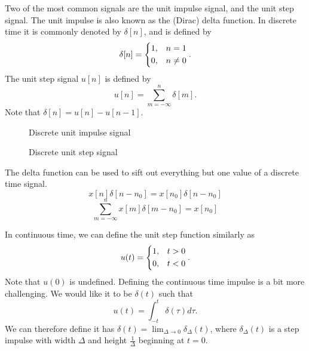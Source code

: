 \documentclass[12pt]{article}
\begin{document}
Two of the most common signals are the unit impulse signal, and the unit step signal. The unit impulse is also known as the (Dirac) delta function. In discrete time it is commonly denoted by $\delta[n]$, and is defined by
\[\delta[n] =
\begin{dcases}
    1, & n = 1 \\
    0, & n \neq 0
\end{dcases}.\] The unit step signal $u[n]$ is defined by
\[u[n] = \sum_{m=-\infty}^{n}\delta[m].\] Note that $\delta[n] = u[n] - u[n-1]$.

\begin{figure}[ht!]
    \centering
\caption{Discrete unit impulse signal}
\label{fig:discrete-unit-impulse}
\end{figure}

\begin{figure}[ht!]
    \centering
\caption{Discrete unit step signal}
\label{fig:discrete-unit-step}
\end{figure}

The delta function can be used to sift out everything but one value of a discrete time signal.
\[x[n]\delta[n-n_0] = x[n_0]\delta[n-n_0]\]
\[\sum_{m=-\infty}^n x[m]\delta[m-n_0] = x[n_0]\]

In continuous time, we can define the unit step function similarly as \[u(t) =
\begin{dcases}
    1, & t > 0 \\
    0, & t < 0
\end{dcases}.\]
Note that $u(0)$ is undefined. Defining the continuous time impulse is a bit more challenging. We would like it to be $\delta(t)$ such that
\[u(t) = \int_{-t}^{t}\delta(\tau)d\tau.\] We can therefore define it has $\delta(t) = \lim_{\Delta\to 0}\delta_{\Delta}(t)$, where $\delta_{\Delta}(t)$ is a step impulse with width $\Delta$ and height $\frac{1}{\Delta}$ beginning at $t = 0$.
\end{document}
